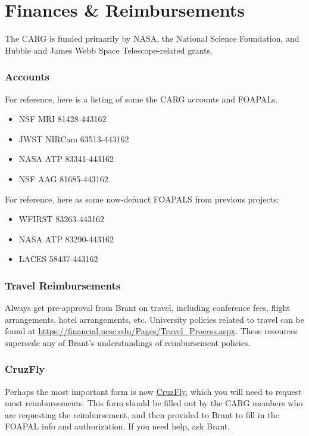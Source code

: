 \section{Finances \& Reimbursements}
\label{sec:finances}

The CARG is funded primarily by
NASA,
the National Science Foundation,
and Hubble and James Webb Space
Telescope-related grants. 

\subsubsection{Accounts}
For reference, here is a listing of some the CARG accounts and FOAPALs.
\begin{itemize}
\item NSF MRI 81428-443162
\item JWST NIRCam 63513-443162
\item NASA ATP 83341-443162
\item NSF AAG 81685-443162
\end{itemize}

For reference, here as some now-defunct FOAPALS from previous projects:

\begin{itemize}
\item WFIRST 83263-443162
\item NASA ATP 83290-443162
\item LACES 58437-443162
\end{itemize}

\subsubsection{Travel Reimbursements}

Always get pre-approval from 
Brant on travel,
including conference fees,
flight arrangements, 
hotel arrangements, etc. 
University policies related to
travel can be found at \href{https://financial.ucsc.edu/Pages/Travel_Process.aspx}{https://financial.ucsc.edu/Pages/Travel\_Process.aspx}. These resources
supersede any of Brant's 
understandings of reimbursement
policies.\\

\subsubsection{CruzFly}

\noindent
Perhaps the most important form is now 
\href{http://cruzfly.ucsc.edu/}{CruzFly}, which
you will need to request most reimbursements.
This form should be filled out by
the CARG members who are 
requesting the reimbursement, and
then provided to Brant to fill in
the FOAPAL info and authorization.
If you need help, ask Brant.

